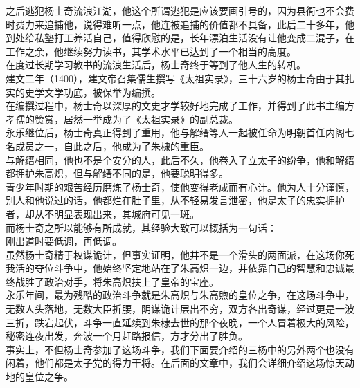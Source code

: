 \begin{multicols}{\theparacolNo}
之后逃犯杨士奇流浪江湖，他这个所谓逃犯是应该要画引号的，因为县衙也不会费时费力来追捕他，说得难听一点，他连被追捕的价值都不具备，此后二十多年，他到处给私塾打工养活自己，值得欣慰的是，长年漂泊生活没有让他变成二混子，在工作之余，他继续努力读书，其学术水平已达到了一个相当的高度。\\

在度过长期学习教书的流浪生活后，杨士奇终于等到了他人生的转机。\\

建文二年（1400），建文帝召集儒生撰写《太祖实录》，三十六岁的杨士奇由于其扎实的史学文学功底，被保举为编撰。\\

在编撰过程中，杨士奇以深厚的文史才学较好地完成了工作，并得到了此书主编方孝孺的赞赏，居然一举成为了《太祖实录》的副总裁。\\

永乐继位后，杨士奇真正得到了重用，他与解缙等人一起被任命为明朝首任内阁七名成员之一，自此之后，他成为了朱棣的重臣。\\

与解缙相同，他也不是个安分的人，此后不久，他卷入了立太子的纷争，他和解缙都拥护朱高炽，但与解缙不同的是，他要聪明得多。\\

青少年时期的艰苦经历磨炼了杨士奇，使他变得老成而有心计。他为人十分谨慎，别人和他说过的话，他都烂在肚子里，从不轻易发言泄密，他是太子的忠实拥护者，却从不明显表现出来，其城府可见一斑。\\

而杨士奇之所以能够有所成就，其经验大致可以概括为一句话：\\

刚出道时要低调，再低调。\\

虽然杨士奇精于权谋诡计，但事实证明，他并不是一个滑头的两面派，在这场你死我活的夺位斗争中，他始终坚定地站在了朱高炽一边，并依靠自己的智慧和忠诚最终战胜了政治对手，将朱高炽扶上了皇帝的宝座。\\

永乐年间，最为残酷的政治斗争就是朱高炽与朱高煦的皇位之争，在这场斗争中，无数人头落地，无数大臣折腰，阴谋诡计层出不穷，双方各出奇谋，经过更是一波三折，跌宕起伏，斗争一直延续到朱棣去世的那个夜晚，一个人冒着极大的风险，秘密连夜出发，奔波一个月赶路报信，方才分出了胜负。\\

事实上，不但杨士奇参加了这场斗争，我们下面要介绍的三杨中的另外两个也没有闲着，他们都是太子党的得力干将。在后面的文章中，我们会详细介绍这场惊天动地的皇位之争。\\


\end{multicols}
